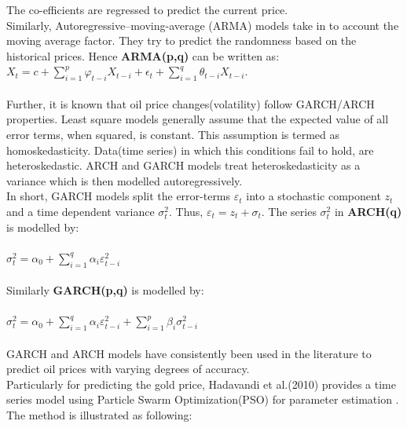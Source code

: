 \documentclass[runningheads]{llncs}
\begin{document}
The co-efficients are regressed to predict the current price. \\

Similarly, Autoregressive–moving-average (ARMA) models take in to account the moving average factor. They try to predict the randomness based on the historical prices.  Hence \textbf{ARMA(p,q)} can be written as:\\

$ X_{t} = c + \sum\limits_{i=1}^p \varphi_{t-i}X_{t-i} + \epsilon_{t} + \sum\limits_{i=1}^q \theta_{t-i}X_{t-i}$.\\
\\

Further, it is known that oil price changes(volatility) follow GARCH/ARCH properties. Least square models generally assume that the expected value of all error terms, when squared, is constant. This assumption is termed as homoskedasticity. Data(time series) in which this conditions fail to hold, are heteroskedastic. ARCH and GARCH models treat heteroskedasticity as a variance which is then modelled autoregressively.\cite{engle}\\

In short, GARCH models split the error-terms $\varepsilon_t$ into a stochastic component $z_{t}$ and a time dependent variance $\sigma^2_{t}$. Thus, $ \varepsilon_t = z_{t} + \sigma_{t}$. The series $\sigma^2_{t}$ in \textbf{ARCH(q)} is modelled by:\\\\

$\sigma^2_{t} = \alpha_{0} + \sum\limits_{i=1}^q \alpha_{i}\varepsilon_{t-i}^2 $\\\\

\noindent Similarly \textbf{GARCH(p,q)} is modelled by:\\\\

$\sigma^2_{t} = \alpha_{0} + \sum\limits_{i=1}^q \alpha_{i}\varepsilon_{t-i}^2 + \sum\limits_{i=1}^p \beta_{i}\sigma_{t-i}^2 $\\\\

GARCH and ARCH models have consistently been used in the literature to predict oil prices with varying degrees of accuracy. \\

Particularly for predicting the gold price, Hadavandi et al.(2010) provides a time series model using Particle Swarm Optimization(PSO) for parameter estimation \cite{gold-pso}. The method is illustrated as following:
\end{document}
